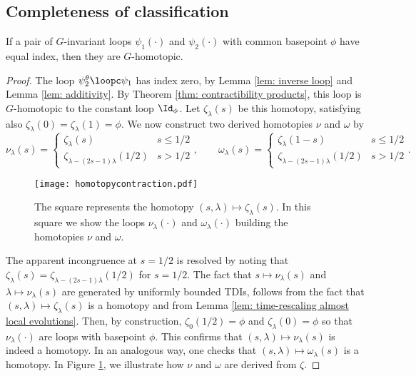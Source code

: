 \subsection{Completeness of classification}
\begin{proposition}\label{lem: completeness products}
	If a pair of $G$-invariant loops $\psi_1(\cdot)$ and $\psi_2(\cdot)$ with common basepoint $\phi$ have equal index, then they are $G$-homotopic.  
\end{proposition}
\begin{proof}
	The loop $\psi^\theta_2\loopc\psi_1$ has index zero, by Lemma \ref{lem: inverse loop} and Lemma \ref{lem: additivity}.  By Theorem \ref{thm: contractibility products}, this loop is $G$-homotopic to the constant loop $\Id_\phi$.  Let $\zeta_\lambda(s)$ be this homotopy, satisfying also $\zeta_\lambda(0)=\zeta_\lambda(1)=\phi$. 
	We now construct two derived homotopies $\nu$ and $\omega$ by 
	\begin{equation*}
	\nu_\lambda(s)=\begin{cases} \zeta_\lambda(s)  &  s\leq 1/2 \\
	\zeta_{\lambda-(2s-1)\lambda}(1/2)   &  s > 1/2
	\end{cases},\qquad
	\omega_\lambda(s)=\begin{cases} \zeta_\lambda(1-s)  &  s\leq 1/2 \\
	\zeta_{\lambda-(2s-1)\lambda}(1/2)   &  s > 1/2
	\end{cases}.
	\end{equation*}
	\begin{figure}[h] 
		\begin{center}
			\texttt{[image: homotopycontraction.pdf]}
			\caption{The square represents the homotopy $(s,\lambda)\mapsto \zeta_\lambda(s)$. In this square we show the loops $\nu_\lambda(\cdot)$ and $\omega_\lambda(\cdot)$ building the homotopies $\nu$ and $\omega$. }
			\label{fig: homotopycontraction}
		\end{center}
	\end{figure}
	The apparent incongruence at $s=1/2$ is resolved by noting that 
	$ \zeta_\lambda(s)=  \zeta_{\lambda-(2s-1)\lambda}(1/2)$ for $s=1/2$. 
	The fact that $s\mapsto \nu_\lambda(s) $ and $\lambda\mapsto \nu_\lambda(s)$ are generated by uniformly bounded TDIs, follows from the fact that $(s,\lambda)\mapsto \zeta_\lambda(s)$ is a homotopy and from Lemma \ref{lem: time-rescaling almost local evolutions}. 
	Then, by construction,  $\zeta_0(1/2)=\phi$ and $\zeta_{\lambda}(0)=\phi$ so that $\nu_\lambda(\cdot)$ are loops with basepoint $\phi$. This confirms that  $(s,\lambda)\mapsto \nu_\lambda(s)$ is indeed a homotopy.  In an analogous way, one checks that  $(s,\lambda)\mapsto \omega_\lambda(s)$ is a homotopy.   In Figure \ref{fig: homotopycontraction}, we illustrate how $\nu$ and $\omega$ are derived from $\zeta$.

\end{proof}
